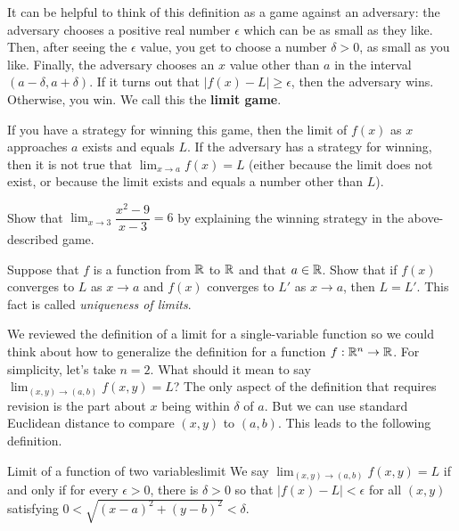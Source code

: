 \documentclass[svgnames]{watsonbook}
\begin{document}
It can be helpful to think of this definition as a game against an
adversary: the adversary chooses a positive real number $\epsilon$
which can be as small as they like. Then, after seeing the $\epsilon$
value, you get to choose a number $\delta>0$, as small as you
like. Finally, the adversary chooses an $x$ value other than $a$ in
the interval $(a-\delta, a + \delta)$. If it turns out that $|f(x) -
L| \geq \epsilon$, then the adversary wins. Otherwise, you win. We
call this the \textbf{limit game}. 

If you have a strategy for winning this game, then the limit of $f(x)$
as $x$ approaches $a$ exists and equals $L$. If the adversary has a
strategy for winning, then it is not true that $\lim_{x \to a} f(x) =
L$ (either because the limit does not exist, or because the limit
exists and equals a number other than $L$).

\begin{exercise}{}{}
  Show that $\displaystyle{\lim_{x \to 3}}\dfrac{x^2 - 9}{x - 3} = 6$ by explaining
  the winning strategy in the above-described game. 
\end{exercise}

\begin{exercise}{}{}
  Suppose that $f$ is a function from $\mathbb{R}$ to $\mathbb{R}$ and that
  $a \in \mathbb{R}$. Show that if $f(x)$ converges to $L$ as $x\to a$ and
  $f(x)$ converges to $L'$ as $x\to a$, then $L = L'$. This fact is called
  \textit{uniqueness of limits}. 
\end{exercise}

We reviewed the definition of a limit for a single-variable function
so we could think about how to generalize the definition for a
function $f:\mathbb{R}^n \to \mathbb{R}$. For simplicity, let's take $n = 2$. What
should it mean to say
$\displaystyle{\lim_{(x,y) \to (a,b)} f(x,y)} = L$? The only aspect of 
the definition that requires revision is the part about $x$ being
within $\delta$ of $a$. But we can use standard Euclidean distance to
compare $(x,y)$ to $(a,b)$. This leads to the following definition. 

\begin{defn}{Limit of a function of two variables}{limit}
  We say $\lim_{(x,y)\to (a,b)} f(x,y) = L$ if and only if for every
  $\epsilon > 0$, there is $\delta>0$ so that $|f(x) - L| < \epsilon$
  for all $(x,y)$ satisfying $0 < \sqrt{(x -a)^2 + (y-b)^2} < \delta$. 
\end{defn}
\end{document}
